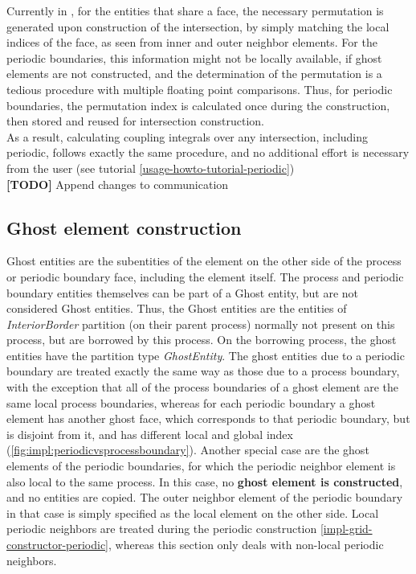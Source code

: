\noindent
Currently in \curvgrid{}, for the entities that share a face, the necessary permutation is generated upon construction of the intersection, by simply matching the local indices of the face, as seen from inner and outer neighbor elements. For the periodic boundaries, this information might not be locally available, if ghost elements are not constructed, and the determination of the permutation is a tedious procedure with multiple floating point comparisons. Thus, for periodic boundaries, the permutation index is calculated once during the construction, then stored and reused for intersection construction. \\

\noindent
As a result, calculating coupling integrals over any intersection, including periodic, follows exactly the same procedure, and no additional effort is necessary from the user (see tutorial \cref{usage-howto-tutorial-periodic}) \\





\textbf{[TODO]} Append changes to communication \\






\subsection{Ghost element construction}
\label{impl-grid-constructor-ghost}

\noindent
Ghost entities are the subentities of the element on the other side of the process or periodic boundary face, including the element itself. The process and periodic boundary entities themselves can be part of a Ghost entity, but are not considered Ghost entities. Thus, the Ghost entities are the entities of \textit{InteriorBorder} partition (on their parent process) normally not present on this process, but are borrowed by this process. On the borrowing process, the ghost entities have the partition type \textit{GhostEntity}. The ghost entities due to a periodic boundary are treated exactly the same way as those due to a process boundary, with the exception that all of the process boundaries of a ghost element are the same local process boundaries, whereas for each periodic boundary a ghost element has another ghost face, which corresponds to that periodic boundary, but is disjoint from it, and has different local and global index (\cref{fig:impl:periodicvsprocessboundary}). Another special case are the ghost elements of the periodic boundaries, for which the periodic neighbor element is also local to the same process. In this case, no \textbf{ghost element is constructed}, and no entities are copied. The outer neighbor element of the periodic boundary in that case is simply specified as the local element on the other side. Local periodic neighbors are treated during the periodic construction \cref{impl-grid-constructor-periodic}, whereas this section only deals with non-local periodic neighbors. \\

